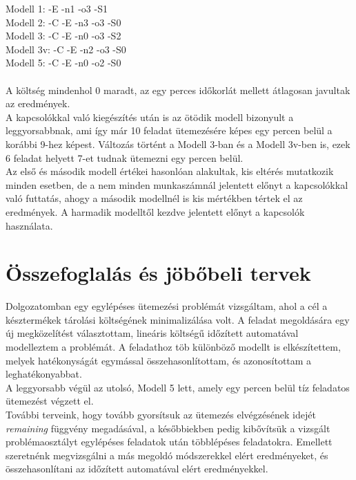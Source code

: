 \documentclass [12pt]{report}
\begin{document}
    Modell 1: -E -n1 -o3 -S1\\
    Modell 2: -C -E -n3 -o3 -S0\\
   	Modell 3: -C -E -n0 -o3 -S2\\
   	Modell 3v: -C -E -n2 -o3 -S0\\
    Modell 5: -C -E -n0 -o2 -S0\\\\
      A költség mindenhol 0 maradt, az egy perces időkorlát mellett átlagosan javultak az eredmények.\\
    A kapcsolókkal való kiegészítés után is az ötödik modell bizonyult a leggyorsabbnak, ami így már 10 feladat ütemezésére képes egy percen belül a korábbi 9-hez képest. Változás történt a  Modell 3-ban és a Modell 3v-ben is, ezek 6 feladat helyett 7-et tudnak ütemezni egy percen belül.\\
    Az első és második modell értékei hasonlóan alakultak, kis eltérés mutatkozik minden esetben, de a nem minden munkaszámnál jelentett előnyt a kapcsolókkal való futtatás, ahogy a második modellnél is kis mértékben tértek el az eredmények. A harmadik modelltől kezdve jelentett előnyt a kapcsolók használata. 
   
   

\chapter{Összefoglalás és jöbőbeli tervek}
Dolgozatomban egy egylépéses ütemezési problémát vizsgáltam, ahol a cél a késztermékek tárolási költségének minimalizálása volt. A feladat megoldására egy új megközelítést választottam, lineáris költségű időzített automatával modelleztem a problémát. A feladathoz töb különböző modellt is elkészítettem, melyek hatékonyságát egymással összehasonlítottam, és azonosítottam a leghatékonyabbat.\\
A leggyorsabb végül az utolsó, Modell 5 lett, amely egy percen belül tíz feladatos ütemezést végzett el.\\
További terveink, hogy tovább gyorsítsuk az ütemezés elvégzésének idejét \emph{remaining} függvény megadásával, a későbbiekben pedig kibővítsük a vizsgált problémaosztályt egylépéses feladatok után többlépéses feladatokra. Emellett szeretnénk megvizsgálni a más megoldó módszerekkel elért eredményeket, és összehasonlítani az időzített automatával elért eredményekkel. 


\clearpage
{}


\end{document}
